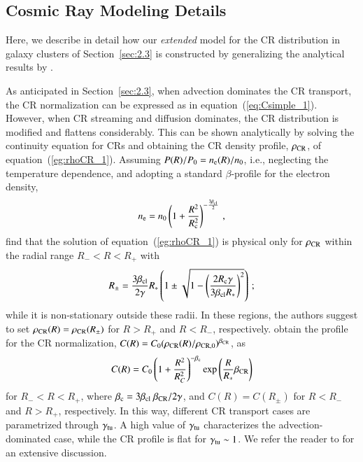 \documentclass[useAMS,usenatbib]{mn2e}
\begin{document}

%



\begin{appendix}

\section{Cosmic Ray Modeling Details}
\label{app:B}

Here, we describe in detail how our \emph{extended} model for the CR distribution
in galaxy clusters of Section~\ref{sec:2.3} is constructed by generalizing the
analytical results by \cite{2011A&A...527A..99E}.

As anticipated in Section~\ref{sec:2.3}, when advection dominates the CR
transport, the CR normalization can be expressed as in
equation~(\ref{eq:Csimple_1}). However, when CR streaming and diffusion
dominates, the CR distribution is modified and flattens considerably. This can
be shown analytically by solving the continuity equation for CRs and obtaining
the CR density profile, $\rho_{{\mathrm{CR}}}$, of
equation~(\ref{eg:rhoCR_1}). Assuming $P(R)/P_{0}=n_{{\mathrm{e}}}(R)/n_{0}$, i.e.,
neglecting the temperature dependence, and adopting a standard $\beta$-profile
for the electron density,
%
\begin{equation}
n_{{\mathrm{e}}} = n_{0} \left( 1+\frac{R^{2}}{R_{{\mathrm{c}}}^{2}} \right)^{-\frac{3\beta_{{\mathrm{cl}}}}{2}} \, ,
\label{eq:beta_profile}
\end{equation}
% 
\cite{2011A&A...527A..99E} find that the solution of equation~(\ref{eg:rhoCR_1}) is physical only 
for $\rho_{{\mathrm{CR}}}$ within the radial range $R_{-} < R < R_{+}$ with
%
\begin{equation}
R_{\pm} = \frac{3\beta_{{\mathrm{cl}}}}{2\gamma}R_{*}\left(1\pm\sqrt{1-\left(\frac{2R_{{\mathrm{c}}}\gamma}{3\beta_{{\mathrm{cl}}}R_{*}}\right)^{2}}\right) \, ;
\label{eq:Rpm}
\end{equation} 
%
while it is non-stationary outside these radii. In these regions, the authors
suggest to set $\rho_{{\mathrm{CR}}}(R) = \rho_{\rm{CR}}(R_{\pm})$ for $R > R_{+}$
and $R < R_{-}$, respectively. \cite{2011A&A...527A..99E} obtain the profile for
the CR normalization,
$C(R)=C_{0}(\rho_{{\mathrm{CR}}}(R)/\rho_{{\mathrm{CR}},0})^{\beta_{{\mathrm{CR}}}}$, as
%
\begin{equation}
C(R) = C_{0}\left( 1+ \frac{R^{2}}{R_{C}^{2}} \right)^{-\beta_{{\mathrm{c}}}} {\mathrm{exp}}\left( {\frac{R}{R_{*}}\beta_{{\mathrm{CR}}}} \right)
\label{eq:Ctransport}
\end{equation} 
%
for $R_{-}<R<R_{+}$, where
$\beta_{{\mathrm{c}}}=3\beta_{{\mathrm{cl}}}~\beta_{{\mathrm{CR}}}/2\gamma$, and $C(R) =
C(R_{\pm})$ for $R<R_{-}$ and $R>R_{+}$, respectively. In this way, different CR
transport cases are parametrized through $\gamma_{{\mathrm{tu}}}$.  A high value of
$\gamma_{{\mathrm{tu}}}$ characterizes the advection-dominated case, while the CR
profile is flat for $\gamma_{{\mathrm{tu}}} \sim1$. We refer the reader to
\cite{2011A&A...527A..99E} for an extensive discussion.


\end{appendix}
\end{document}
